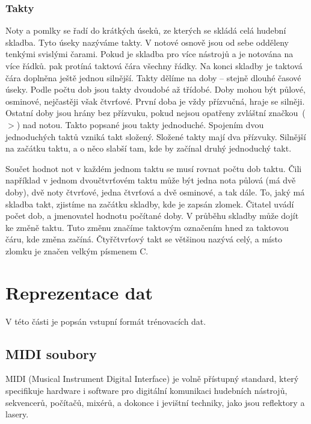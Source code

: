 \subsection*{Takty}
Noty a pomlky se řadí do krátkých úseků, ze kterých se skládá celá hudební skladba.
Tyto úseky nazýváme takty.
V notové osnově jsou od sebe odděleny tenkými svislými čarami.
Pokud je skladba pro více nástrojů a je notována na více řádků. pak protíná taktová čára všechny řádky.
Na konci skladby je taktová čára doplněna ještě jednou silnější. 
Takty dělíme na doby -- stejně dlouhé časové úseky.
Podle počtu dob jsou takty dvoudobé až třídobé.
Doby mohou být půlové, osminové, nejčastěji však čtvrťové.
První doba je vždy přízvučná, hraje se silněji.
Ostatní doby jsou hrány bez přízvuku, pokud nejsou opatřeny zvláštní značkou~($>$) nad notou.
Takto popsané jsou takty jednoduché.
Spojením dvou jednoduchých taktů vzniká takt složený.
Složené takty mají dva přízvuky.
Silnější na začátku taktu, a o něco slabší tam, kde by začínal druhý jednoduchý takt.\par
Součet hodnot not v každém jednom taktu se musí rovnat počtu dob taktu.
Čili například v jednom  dvoučtvrťovém taktu může být jedna nota půlová (má dvě doby), dvě noty čtvrťové, jedna čtvrťová a dvě osminové, a tak dále.
To, jaký má skladba takt, zjistíme na začátku skladby, kde je zapsán zlomek.
Čitatel uvádí počet dob, a jmenovatel hodnotu počítané doby.
V průběhu skladby může dojít ke změně taktu.
Tuto změnu značíme taktovým označením hned za taktovou čáru, kde změna začíná.
Čtyřčtvrťový takt se většinou nazývá celý, a místo zlomku je značen velkým písmenem C.
\cite{cmiral,zenkl}


\chapter{Reprezentace dat}
V této části je popsán vstupní formát trénovacích dat.

\section{MIDI soubory}
MIDI (Musical Instrument Digital Interface) je volně přístupný standard,
který specifikuje hardware i software pro digitální komunikaci hudebních nástrojů,
sekvencerů, počítačů, mixérů, a dokonce i jevištní techniky, jako jsou reflektory a lasery.
\cite{MIDI_tutorials}
\par

